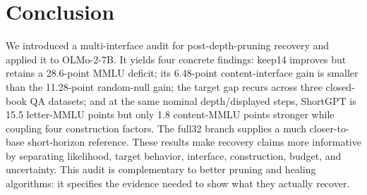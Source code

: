 \section{Conclusion}
\label{sec:conclusion}

We introduced a multi-interface audit for post-depth-pruning recovery and
applied it to OLMo-2-7B. It yields four concrete findings: keep14 improves but
retains a 28.6-point MMLU deficit; its 6.48-point content-interface gain is
smaller than the 11.28-point random-null gain; the target gap recurs across
three closed-book QA datasets; and at the same nominal depth/displayed steps,
ShortGPT is 15.5 letter-MMLU points but only 1.8 content-MMLU points stronger
while coupling four construction factors. The full32 branch supplies a much
closer-to-base short-horizon reference. These results make recovery claims more
informative by separating likelihood, target behavior, interface,
construction, budget, and uncertainty. This audit is complementary to better
pruning and healing algorithms: it specifies the evidence needed to show what
they actually recover.
